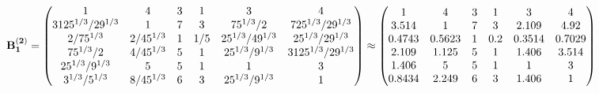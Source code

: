 \documentclass[10pt,a4paper]{article}
\begin{document}
	\[
		\bold{B_1^{(2)}} = 
		\begin{pmatrix}
			{1}{} & {{4}}{} & {{3}}{} & {1}{} & {{3}}{} & {{4}}{} \\
			{{3125^ {1 / 3}}} / {{2}{9^ {1 / 3}}} & {1}{} & {{7}}{} & {{3}}{} & {{75^ {1 / 3}}} / {{2}} & {{7}{25^ {1 / 3}}} / {{2}{9^ {1 / 3}}} \\
			{{2}} / {{75^ {1 / 3}}} & {{2}} / {{45^ {1 / 3}}} & {1}{} & {1} / {{5}} & {{25^ {1 / 3}}} / {{4}{9^ {1 / 3}}} & {{25^ {1 / 3}}} / {{2}{9^ {1 / 3}}} \\
			{{75^ {1 / 3}}} / {{2}} & {{4}} / {{45^ {1 / 3}}} & {{5}}{} & {1}{} & {{25^ {1 / 3}}} / {{9^ {1 / 3}}} & {{3125^ {1 / 3}}} / {{2}{9^ {1 / 3}}} \\
			{{25^ {1 / 3}}} / {{9^ {1 / 3}}} & {{5}}{} & {{5}}{} & {1}{} & {1}{} & {{3}}{} \\
			{{3^ {1 / 3}}} / {{5^ {1 / 3}}} & {{8}} / {{45^ {1 / 3}}} & {{6}}{} & {{3}}{} & {{25^ {1 / 3}}} / {{9^ {1 / 3}}} & {1}{} \\
		\end{pmatrix}
		\approx
		\begin{pmatrix}
			1        & 4        & 3        & 1        & 3        & 4        \\
			3.514    & 1        & 7        & 3        & 2.109    & 4.92     \\
			0.4743   & 0.5623   & 1        & 0.2      & 0.3514   & 0.7029   \\
			2.109    & 1.125    & 5        & 1        & 1.406    & 3.514    \\
			1.406    & 5        & 5        & 1        & 1        & 3        \\
			0.8434   & 2.249    & 6        & 3        & 1.406    & 1        \\
		\end{pmatrix}
	\]
\end{document}
